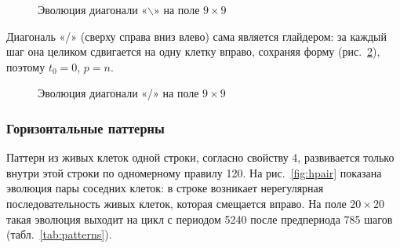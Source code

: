 \begin{figure}[H]
	\centering
	\begin{minipage}{0.23\textwidth}\centering{}\end{minipage}
	\begin{minipage}{0.23\textwidth}\centering{}\end{minipage}
	\begin{minipage}{0.23\textwidth}\centering{}\end{minipage}
	\begin{minipage}{0.23\textwidth}\centering{}\end{minipage}
	\caption{Эволюция диагонали «$\backslash$» на поле $9 \times 9$}
	\label{fig:diagb}
\end{figure}

Диагональ «/» (сверху справа вниз влево) сама является глайдером: за каждый шаг она целиком сдвигается на одну клетку вправо, сохраняя форму (рис.~\ref{fig:diagf}), поэтому $t_0 = 0$, $p = n$.

\begin{figure}[H]
	\centering
	\begin{minipage}{0.23\textwidth}\centering{}\end{minipage}
	\begin{minipage}{0.23\textwidth}\centering{}\end{minipage}
	\begin{minipage}{0.23\textwidth}\centering{}\end{minipage}
	\begin{minipage}{0.23\textwidth}\centering{}\end{minipage}
	\caption{Эволюция диагонали «/» на поле $9 \times 9$}
	\label{fig:diagf}
\end{figure}

\subsubsection*{Горизонтальные паттерны}

Паттерн из живых клеток одной строки, согласно свойству 4, развивается только внутри этой строки по одномерному правилу 120. На рис.~\ref{fig:hpair} показана эволюция пары соседних клеток: в строке возникает нерегулярная последовательность живых клеток, которая смещается вправо. На поле $20 \times 20$ такая эволюция выходит на цикл с периодом 5240 после предпериода 785 шагов (табл.~\ref{tab:patterns}).

